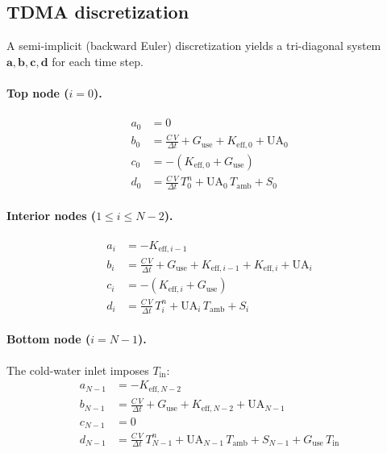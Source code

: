 \subsection{TDMA discretization}

A semi-implicit (backward Euler) discretization yields a tri-diagonal system $\mathbf{a},\mathbf{b},\mathbf{c},\mathbf{d}$ for each time step.

\paragraph{Top node ($i = 0$).}
\begin{align}
  a_0 &= 0 \label{eq:tdma-top-a}\\
  b_0 &= \frac{C\,V}{\Delta t} + G_\text{use} + K_{\text{eff},0} + \text{UA}_0 \label{eq:tdma-top-b}\\
  c_0 &= -(K_{\text{eff},0} + G_\text{use}) \label{eq:tdma-top-c}\\
  d_0 &= \frac{C\,V}{\Delta t}\,T_0^n + \text{UA}_0\,T_\text{amb} + S_0 \label{eq:tdma-top-d}
\end{align}

\paragraph{Interior nodes ($1 \le i \le N-2$).}
\begin{align}
  a_i &= -K_{\text{eff},i-1} \label{eq:tdma-int-a}\\
  b_i &= \frac{C\,V}{\Delta t} + G_\text{use} + K_{\text{eff},i-1} + K_{\text{eff},i} + \text{UA}_i \label{eq:tdma-int-b}\\
  c_i &= -(K_{\text{eff},i} + G_\text{use}) \label{eq:tdma-int-c}\\
  d_i &= \frac{C\,V}{\Delta t}\,T_i^n + \text{UA}_i\,T_\text{amb} + S_i \label{eq:tdma-int-d}
\end{align}

\paragraph{Bottom node ($i = N-1$).}
The cold-water inlet imposes $T_\text{in}$:
\begin{align}
  a_{N-1} &= -K_{\text{eff},N-2} \label{eq:tdma-bot-a}\\
  b_{N-1} &= \frac{C\,V}{\Delta t} + G_\text{use} + K_{\text{eff},N-2} + \text{UA}_{N-1} \label{eq:tdma-bot-b}\\
  c_{N-1} &= 0 \label{eq:tdma-bot-c}\\
  d_{N-1} &= \frac{C\,V}{\Delta t}\,T_{N-1}^n + \text{UA}_{N-1}\,T_\text{amb} + S_{N-1} + G_\text{use}\,T_\text{in} \label{eq:tdma-bot-d}
\end{align}

